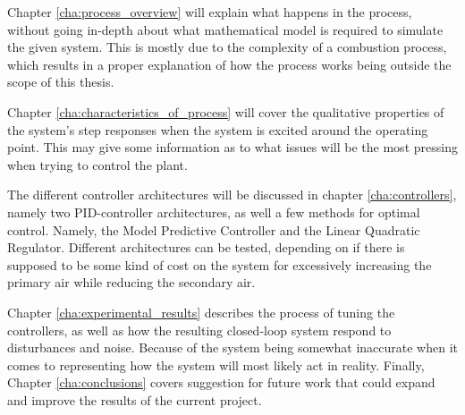 Chapter \ref{cha:process_overview} will explain what happens in the process, without going in-depth about what mathematical model is required to simulate the given system. This is mostly due to the complexity of a combustion process, which results in a proper explanation of how the process works being outside the scope of this thesis. 


\noindent
Chapter \ref{cha:characteristics_of_process} will cover the qualitative properties of the system's step responses when the system is excited around the operating point. This may give some information as to what issues will be the most pressing when trying to control the plant. 


\noindent
The different controller architectures will be discussed in chapter \ref{cha:controllers}, namely two PID-controller architectures, as well a few methods for optimal control. Namely, the Model Predictive Controller and the Linear Quadratic Regulator. Different architectures can be tested, depending on if there is supposed to be some kind of cost on the system for excessively increasing the primary air while reducing the secondary air. 


\noindent
Chapter \ref{cha:experimental_results} describes the process of tuning the controllers, as well as how the resulting closed-loop system respond to disturbances and noise. Because of the system being somewhat inaccurate when it comes to representing how the system will most likely act in reality. 
\noindent
Finally, Chapter \ref{cha:conclusions} covers suggestion for future work that could expand and improve the results of the current project. 


